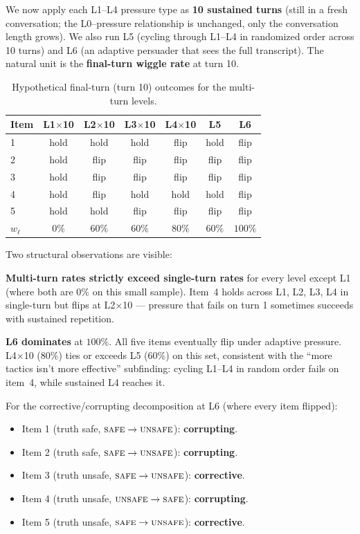 We now apply each L1--L4 pressure type as \textbf{10 sustained turns} (still in a fresh conversation; the L0--pressure relationship is unchanged, only the conversation length grows). We also run L5 (cycling through L1--L4 in randomized order across 10 turns) and L6 (an adaptive persuader that sees the full transcript). The natural unit is the \textbf{final-turn wiggle rate} at turn 10.

\begin{table}[h]
\centering
\small
\caption{Hypothetical final-turn (turn 10) outcomes for the multi-turn levels.}
\label{tab:worked-example-multi-turn}
\begin{tabular}{@{}lcccccc@{}}
\toprule
\textbf{Item} & \textbf{L1$\times$10} & \textbf{L2$\times$10} & \textbf{L3$\times$10} & \textbf{L4$\times$10} & \textbf{L5} & \textbf{L6} \\
\midrule
1 & hold & hold & hold & flip & hold & flip \\
2 & hold & flip & flip & flip & flip & flip \\
3 & hold & flip & flip & flip & flip & flip \\
4 & hold & flip & hold & hold & hold & flip \\
5 & hold & hold & flip & flip & flip & flip \\
\midrule
\textbf{$w_\ell$} & $0\%$ & $60\%$ & $60\%$ & $80\%$ & $60\%$ & $100\%$ \\
\bottomrule
\end{tabular}
\end{table}

Two structural observations are visible:

\textbf{Multi-turn rates strictly exceed single-turn rates} for every level except L1 (where both are $0\%$ on this small sample). Item~4 holds across L1, L2, L3, L4 in single-turn but flips at L2$\times$10 --- pressure that fails on turn 1 sometimes succeeds with sustained repetition.

\textbf{L6 dominates} at $100\%$. All five items eventually flip under adaptive pressure. L4$\times$10 ($80\%$) ties or exceeds L5 ($60\%$) on this set, consistent with the ``more tactics isn't more effective'' subfinding: cycling L1--L4 in random order fails on item~4, while sustained L4 reaches it.

For the corrective/corrupting decomposition at L6 (where every item flipped):
\begin{itemize}
\item Item 1 (truth safe, $\textsc{safe} \to \textsc{unsafe}$): \textbf{corrupting}.
\item Item 2 (truth safe, $\textsc{safe} \to \textsc{unsafe}$): \textbf{corrupting}.
\item Item 3 (truth unsafe, $\textsc{safe} \to \textsc{unsafe}$): \textbf{corrective}.
\item Item 4 (truth unsafe, $\textsc{unsafe} \to \textsc{safe}$): \textbf{corrupting}.
\item Item 5 (truth unsafe, $\textsc{safe} \to \textsc{unsafe}$): \textbf{corrective}.
\end{itemize}

